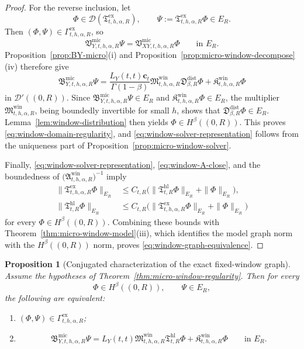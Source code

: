 \documentclass[11pt,a4paper]{amsart}
\theoremstyle{plain}
\newtheorem{proposition}[theorem]{Proposition}
\theoremstyle{definition}
\theoremstyle{remark}
\begin{document}
\begin{proof}
  For the reverse inclusion, let
  \[
  \Phi\in\mathcal D(\mathfrak T_{t,h,\alpha,R}^{\mathrm{ex}}),
  \qquad
  \Psi:=\mathfrak T_{t,h,\alpha,R}^{\mathrm{ex}}\Phi\in E_R.
\]
Then \((\Phi,\Psi)\in\Gamma_{t,h,\alpha,R}^{\mathrm{ex}}\), so
  \[
  \mathfrak V_{Y,t,h,\alpha,R}^{\mathrm{mic}}\Psi
  =
  \mathfrak V_{XY,t,h,\alpha,R}^{\mathrm{mic}}\Phi
  \qquad\text{in }E_R.
  \]
  Proposition~\ref{prop:BY-micro}(i) and
  Proposition~\ref{prop:micro-window-decompose}(iv) therefore give
  \[
  \mathfrak B_{Y,t,h,\alpha,R}^{\mathrm{mic}}\Psi
  =
  \frac{L_Y(t,t)\mathbf c_t}{\Gamma(1-\beta)}
  \mathfrak M_{t,h,\alpha,R}^{\mathrm{win}}
  \mathfrak D_{\beta,R}^{\mathrm{dist}}\Phi
  +
  \mathfrak K_{t,h,\alpha,R}^{\mathrm{win}}\Phi
  \]
  in \(\mathcal D'((0,R))\). Since
  \(\mathfrak B_{Y,t,h,\alpha,R}^{\mathrm{mic}}\Psi\in E_R\) and
  \(\mathfrak K_{t,h,\alpha,R}^{\mathrm{win}}\Phi\in E_R\), the multiplier
  \(\mathfrak M_{t,h,\alpha,R}^{\mathrm{win}}\), being boundedly invertible for small \(h\), shows
  that \(\mathfrak D_{\beta,R}^{\mathrm{dist}}\Phi\in E_R\). Lemma~\ref{lem:window-distribution}
  then yields \(\Phi\in H^\beta((0,R))\). This proves \eqref{eq:window-domain-regularity}, and
  \eqref{eq:window-solver-representation} follows from the uniqueness part of
  Proposition~\ref{prop:micro-window-solver}.
  
  Finally, \eqref{eq:window-solver-representation}, \eqref{eq:window-A-close}, and the boundedness
  of \(\bigl(\mathfrak A_{t,h,\alpha,R}^{\mathrm{win}}\bigr)^{-1}\) imply
  \begin{align*}
  \|\mathfrak T_{t,h,\alpha,R}^{\mathrm{ex}}\Phi\|_{E_R}
  &\le
  C_{t,R}\bigl(
  \|\mathfrak T_{t,R}^{\mathrm{hl}}\Phi\|_{E_R}+\|\Phi\|_{E_R}
  \bigr),\\
  \|\mathfrak T_{t,R}^{\mathrm{hl}}\Phi\|_{E_R}
  &\le
  C_{t,R}\bigl(
  \|\mathfrak T_{t,h,\alpha,R}^{\mathrm{ex}}\Phi\|_{E_R}+\|\Phi\|_{E_R}
  \bigr)
  \end{align*}
  for every \(\Phi\in H^\beta((0,R))\). Combining these bounds with
  Theorem~\ref{thm:micro-window-model}(iii), which identifies the model graph norm with the
  \(H^\beta((0,R))\) norm, proves \eqref{eq:window-graph-equivalence}.
\end{proof}

\begin{proposition}[Conjugated characterization of the exact fixed-window graph]
\label{prop:micro-window-conjugated}
Assume the hypotheses of Theorem~\ref{thm:micro-window-regularity}. Then for every
\[
\Phi\in H^\beta((0,R)),
\qquad
\Psi\in E_R,
\]
the following are equivalent:
\begin{enumerate}[label=(\roman*)]
\item \((\Phi,\Psi)\in \Gamma_{t,h,\alpha,R}^{\mathrm{ex}}\);
\item
\begin{equation}\label{eq:window-conjugated-characterization}
\mathfrak B_{Y,t,h,\alpha,R}^{\mathrm{mic}}\Psi
=
L_Y(t,t)\mathfrak M_{t,h,\alpha,R}^{\mathrm{win}}
\mathfrak T_{t,R}^{\mathrm{hl}}\Phi
+
\mathfrak K_{t,h,\alpha,R}^{\mathrm{win}}\Phi
\qquad\text{in }E_R.
\end{equation}
\end{enumerate}
\end{proposition}
\end{document}

